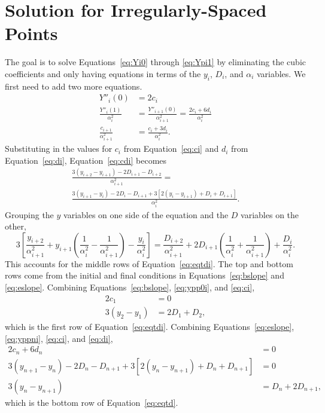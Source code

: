 \documentclass{scrartcl}
\begin{document}
\section{Solution for Irregularly-Spaced Points}\label{sec:irreg-deriv}
The goal is to solve Equations~\ref{eq:Yi0} through \ref{eq:Ypi1}
by eliminating the cubic coefficients and only having equations
in terms of the $y_i$, $D_i$, and $\alpha_i$ variables.
We first need to add two more equations.
\begin{align}
Y''_i(0) &= 2c_i\label{eq:ypp0i}\\
\frac{Y''_i(1)}{\alpha_i^2} &= \frac{Y''_{i+1}(0)}{\alpha_{i+1}^2}
 = \frac{2c_i+6d_i}{\alpha_i^2}\label{eq:yppni}\\
\frac{c_{i+1}}{\alpha_{i+1}^2} &=
	\frac{c_i + 3d_i}{\alpha_i^2}. \label{eq:cdi}
\end{align}
Substituting in the values for $c_i$ from Equation~\ref{eq:ci} and
$d_i$ from Equation~\ref{eq:di}, Equation~\ref{eq:cdi} becomes
\begin{multline}
\frac{3(y_{i+2}-y_{i+1})-2D_{i+1}-D_{i+2}}{\alpha_{i+1}^2} = \\
	\frac{3(y_{i+1}-y_i)-2D_i-D_{i+1}
	+3[2(y_i-y_{i+1})+D_i+D_{i+1}]}{\alpha_i^2}.
\end{multline}
Grouping the $y$ variables on one side of the equation and the $D$
variables on the other,
\begin{equation}
3\left[\frac{y_{i+2}}{\alpha_{i+1}^2}+y_{i+1}\left(\frac{1}{\alpha_i^2}
	-\frac{1}{\alpha_{i+1}^2}\right)-\frac{y_i}{\alpha_i^2}\right]
	= \frac{D_{i+2}}{\alpha_{i+1}^2}
		+2D_{i+1}\left(\frac{1}{\alpha_i^2}+\frac{1}{\alpha_{i+1}^2}\right)
		+\frac{D_i}{\alpha_i^2}.
\end{equation}
This accounts for the middle rows of Equation~\ref{eq:eqtdi}. The
top and bottom rows come from the initial and final conditions
in Equations~\ref{eq:bslope} and \ref{eq:eslope}. Combining
Equations~\ref{eq:bslope}, \ref{eq:ypp0i}, and \ref{eq:ci},
\begin{align}
2c_1 & = 0\\
3(y_2-y_1) &= 2D_1 + D_2,
\end{align}
which is the first row of Equation~\ref{eq:eqtdi}. Combining
Equations~\ref{eq:eslope}, \ref{eq:yppni}, \ref{eq:ci}, and
\ref{eq:di},
\begin{align}
2c_n+6d_n &= 0\\
3(y_{n+1}-y_n)-2D_n-D_{n+1}+3[2(y_n-y_{n+1})+D_n+D_{n+1}] &= 0\\
3(y_n-y_{n+1}) &= D_n+2D_{n+1},
\end{align}
which is the bottom row of Equation~\ref{eq:eqtd}.
\end{document}
